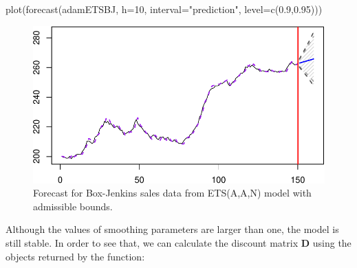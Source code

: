 \documentclass[
]{book}
\newenvironment{Shaded}{\begin{snugshade}}{\end{snugshade}}
\newcommand{\AttributeTok}[1]{\textcolor[rgb]{0.77,0.63,0.00}{#1}}
\newcommand{\ConstantTok}[1]{\textcolor[rgb]{0.00,0.00,0.00}{#1}}
\newcommand{\DecValTok}[1]{\textcolor[rgb]{0.00,0.00,0.81}{#1}}
\newcommand{\FloatTok}[1]{\textcolor[rgb]{0.00,0.00,0.81}{#1}}
\newcommand{\FunctionTok}[1]{\textcolor[rgb]{0.00,0.00,0.00}{#1}}
\newcommand{\NormalTok}[1]{#1}
\newcommand{\OtherTok}[1]{\textcolor[rgb]{0.56,0.35,0.01}{#1}}
\newcommand{\SpecialCharTok}[1]{\textcolor[rgb]{0.00,0.00,0.00}{#1}}
\newcommand{\StringTok}[1]{\textcolor[rgb]{0.31,0.60,0.02}{#1}}
\theoremstyle{definition}
\theoremstyle{definition}
\theoremstyle{definition}
\theoremstyle{definition}
\theoremstyle{remark}
\begin{document}
\begin{Shaded}
\begin{Highlighting}[]
\FunctionTok{plot}\NormalTok{(}\FunctionTok{forecast}\NormalTok{(adamETSBJ, }\AttributeTok{h=}\DecValTok{10}\NormalTok{,}
              \AttributeTok{interval=}\StringTok{"prediction"}\NormalTok{, }\AttributeTok{level=}\FunctionTok{c}\NormalTok{(}\FloatTok{0.9}\NormalTok{,}\FloatTok{0.95}\NormalTok{)))}
\end{Highlighting}
\end{Shaded}

\begin{figure}
\centering
\includegraphics{Svetunkov--2022----ADAM_files/figure-latex/BJsalesAANForecastAdmissible-1.pdf}
\caption{\label{fig:BJsalesAANForecastAdmissible}Forecast for Box-Jenkins sales data from ETS(A,A,N) model with admissible bounds.}
\end{figure}

Although the values of smoothing parameters are larger than one, the model is still stable. In order to see that, we can calculate the discount matrix \(\mathbf{D}\) using the objects returned by the function:

\begin{Shaded}
\end{Shaded}
\end{document}
